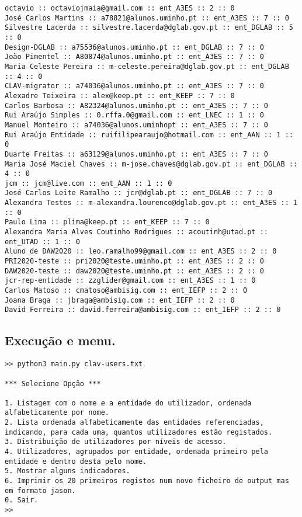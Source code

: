 \documentclass[11pt,a4paper]{report}%
\begin{document}
\begin{verbatim}
octavio :: octaviojmaia@gmail.com :: ent_A3ES :: 2 :: 0
José Carlos Martins :: a78821@alunos.uminho.pt :: ent_A3ES :: 7 :: 0
Silvestre Lacerda :: silvestre.lacerda@dglab.gov.pt :: ent_DGLAB :: 5 :: 0
Design-DGLAB :: a75536@alunos.uminho.pt :: ent_DGLAB :: 7 :: 0
João Pimentel :: A80874@alunos.uminho.pt :: ent_A3ES :: 7 :: 0
Maria Celeste Pereira :: m-celeste.pereira@dglab.gov.pt :: ent_DGLAB :: 4 :: 0
CLAV-migrator :: a74036@alunos.uminho.pt :: ent_A3ES :: 7 :: 0
Alexadre Teixeira :: alex@keep.pt :: ent_KEEP :: 7 :: 0
Carlos Barbosa :: A82324@alunos.uminho.pt :: ent_A3ES :: 7 :: 0
Rui Araújo Simples :: 0.rffa.0@gmail.com :: ent_LNEC :: 1 :: 0
Manuel Monteiro :: a74036@alunos.uminhopt :: ent_A3ES :: 7 :: 0
Rui Araújo Entidade :: ruifilipearaujo@hotmail.com :: ent_AAN :: 1 :: 0
Duarte Freitas :: a63129@alunos.uminho.pt :: ent_A3ES :: 7 :: 0
Maria José Maciel Chaves :: m-jose.chaves@dglab.gov.pt :: ent_DGLAB :: 4 :: 0
jcm :: jcm@live.com :: ent_AAN :: 1 :: 0
José Carlos Leite Ramalho :: jcr@dglab.pt :: ent_DGLAB :: 7 :: 0
Alexandra Testes :: m-alexandra.lourenco@dglab.gov.pt :: ent_A3ES :: 1 :: 0
Paulo Lima :: plima@keep.pt :: ent_KEEP :: 7 :: 0
Alexandra Maria Alves Coutinho Rodrigues :: acoutinh@utad.pt :: ent_UTAD :: 1 :: 0
Aluno de DAW2020 :: leo.ramalho99@gmail.com :: ent_A3ES :: 2 :: 0
PRI2020-teste :: pri2020@teste.uminho.pt :: ent_A3ES :: 2 :: 0
DAW2020-teste :: daw2020@teste.uminho.pt :: ent_A3ES :: 2 :: 0
jcr-rep-entidade :: zzglider@gmail.com :: ent_A3ES :: 1 :: 0
Carlos Matoso :: cmatoso@ambisig.com :: ent_IEFP :: 2 :: 0
Joana Braga :: jbraga@ambisig.com :: ent_IEFP :: 2 :: 0
David Ferreira :: david.ferreira@ambisig.com :: ent_IEFP :: 2 :: 0
\end{verbatim}


\subsection{Execução e menu.}
\begin{small}
\begin{verbatim}
>> python3 main.py clav-users.txt

*** Selecione Opção ***

1. Listagem com o nome e a entidade do utilizador, ordenada alfabeticamente por nome.
2. Lista ordenada alfabeticamente das entidades referenciadas, indicando, para cada uma, quantos utilizadores estão registados.
3. Distribuição de utilizadores por níveis de acesso.
4. Utilizadores, agrupados por entidade, ordenada primeiro pela entidade e dentro desta pelo nome.
5. Mostrar alguns indicadores.
6. Imprimir os 20 primeiros registos num novo ficheiro de output mas em formato jason.
0. Sair.
>> 
\end{verbatim}
\end{small}
\end{document}
